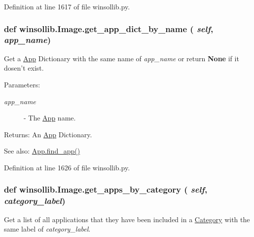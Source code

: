 Definition at line 1617 of file winsollib.py.\hypertarget{classwinsollib_1_1Image_0a4c64e2001437a1312650788196a4e1}{
\subsubsection[get\_\-app\_\-dict\_\-by\_\-name]{\setlength{\rightskip}{0pt plus 5cm}def winsollib.Image.get\_\-app\_\-dict\_\-by\_\-name ( {\em self},  {\em app\_\-name})}}
\label{classwinsollib_1_1Image_0a4c64e2001437a1312650788196a4e1}


Get a \hyperlink{classwinsollib_1_1App}{App} Dictionary with the same name of {\em app\_\-name\/} or return {\bf None} if it dosen't exist. 

\begin{Desc}
\item[Parameters:]
\begin{description}
\item[{\em app\_\-name}]- The \hyperlink{classwinsollib_1_1App}{App} name. \end{description}
\end{Desc}
\begin{Desc}
\item[Returns:]An \hyperlink{classwinsollib_1_1App}{App} Dictionary.\end{Desc}
\begin{Desc}
\item[See also:]\hyperlink{classwinsollib_1_1App_8781b002b53dc32d0d780fa72069def8}{App.find\_\-app()} \end{Desc}


Definition at line 1626 of file winsollib.py.\hypertarget{classwinsollib_1_1Image_719fa59039a7e4a67e0a29a28e3bd5be}{
\subsubsection[get\_\-apps\_\-by\_\-category]{\setlength{\rightskip}{0pt plus 5cm}def winsollib.Image.get\_\-apps\_\-by\_\-category ( {\em self},  {\em category\_\-label})}}
\label{classwinsollib_1_1Image_719fa59039a7e4a67e0a29a28e3bd5be}


Get a list of all applications that they have been included in a \hyperlink{classwinsollib_1_1Category}{Category} with the same label of {\em category\_\-label\/}. 

